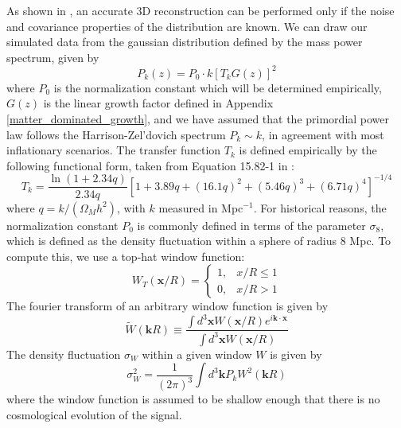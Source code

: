 \documentclass[12pt,preprint]{aastex}			%
\begin{document}
As shown in \citet{Hu02}, an accurate 3D reconstruction can be performed only
if the noise and covariance properties of the distribution are known.  We can
draw our simulated data from the gaussian distribution defined by the mass
power spectrum, given by 
\begin{equation}
  \label{power-spec}
  P_k(z) = P_0 \cdot k [T_kG(z)]^2
\end{equation}
where $P_0$ is the normalization constant which will be determined
empirically, $G(z)$ is the linear growth factor defined in Appendix 
\ref{matter_dominated_growth}, and we have assumed that the 
primordial power law follows the Harrison-Zel'dovich spectrum
$P_k \sim k$, in agreement with most inflationary scenarios.  The transfer
function $T_k$ is defined empirically by the following functional form, 
taken from Equation  15.82-1 in \citet{Peacock} 
\citep[The form is due to][]{Bardeen86}:
\begin{equation}
  \label{transfer-function}
  T_k = \frac{\ln(1+2.34q)}{2.34q}\left[ 1 + 3.89q + (16.1q)^2 + 
    (5.46q)^3 + (6.71q)^4 \right]^{-1/4}
\end{equation}
where $q = k/(\Omega_M h^2)$, with $k$ measured in Mpc$^{-1}$. 
For historical reasons, the normalization constant $P_0$ is commonly 
defined in terms of the parameter $\sigma_8$, which is defined as the density 
fluctuation within a sphere of radius 8 Mpc.  To compute this, we use a 
top-hat window function:
\begin{equation}
\label{top-hat}
  W_T(\mathbf{x}/R) = \left\{
    \begin{array}{ll}
      1, & x/R \le 1 \\
      0, & x/R > 1
    \end{array}
    \right.
\end{equation} 
The fourier transform of an arbitrary window function is given by
\begin{equation}
  \label{window-transform}
  \widetilde{W}(\mathbf{k}R) \equiv \frac{\int d^3\mathbf{x} W(\mathbf{x}/R) e^{i\mathbf{k}\cdot\mathbf{x}}}{\int d^3\mathbf{x} W(\mathbf{x}/R)}
\end{equation}
The density fluctuation $\sigma_W$ within a given window $W$ is given by
\begin{equation}
  \label{powerspec-sigma-def}
  \sigma_W^2 = \frac{1}{(2\pi)^3}\int d^3\mathbf{k} P_k W^2(\mathbf{k}R)
\end{equation}
where the window function is assumed to be shallow enough that there is no
cosmological evolution of the signal.
\end{document}
